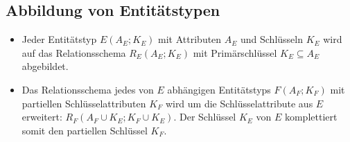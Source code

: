         \subsection{Abbildung von Entitätstypen} %
            \begin{itemize}
            	\item Jeder Entitätstyp \( E(A_E; K_E) \) mit Attributen \(A_E\) und Schlüsseln \(K_E\) wird auf das Relationsschema \( R_E(A_E; K_E) \) mit Primärschlüssel \( K_E \subseteq A_E \) abgebildet.
            	\item Das Relationsschema jedes von \(E\) abhängigen Entitätstyps \(F(A_F; K_F)\) mit partiellen Schlüsselattributen \(K_F\) wird um die Schlüsselattribute aus \(E\) erweitert: \( R_F(A_F \cup K_E; K_F \cup K_E) \). Der Schlüssel \(K_E\) von \(E\) komplettiert somit den partiellen Schlüssel \(K_F\).
            \end{itemize}


